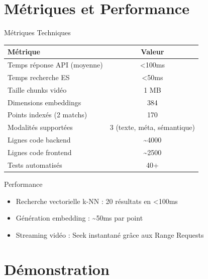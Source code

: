 \documentclass[11pt]{beamer}
\begin{document}
\section{Métriques et Performance}

\begin{frame}{Métriques Techniques}
\begin{table}
\centering
\begin{tabular}{|l|c|}
\hline
\textbf{Métrique} & \textbf{Valeur} \\
\hline
Temps réponse API (moyenne) & \textless 100ms \\
Temps recherche ES & \textless 50ms \\
Taille chunks vidéo & 1 MB \\
Dimensions embeddings & 384 \\
Points indexés (2 matchs) & 170 \\
Modalités supportées & 3 (texte, méta, sémantique) \\
Lignes code backend & \textasciitilde4000 \\
Lignes code frontend & \textasciitilde2500 \\
Tests automatisés & 40+ \\
\hline
\end{tabular}
\end{table}

\vspace{0.2cm}

\begin{block}{Performance}
\begin{itemize}
    \item Recherche vectorielle k-NN : 20 résultats en \textless 100ms
    \item Génération embedding : \textasciitilde50ms par point
    \item Streaming vidéo : Seek instantané grâce aux Range Requests
\end{itemize}
\end{block}
\end{frame}

\section{Démonstration}
\end{document}

